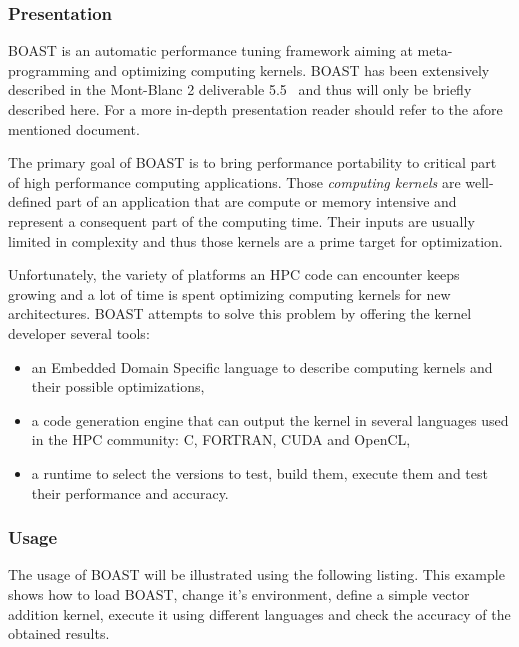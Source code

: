\subsubsection{Presentation}

BOAST is an automatic performance tuning framework aiming at meta-programming and optimizing computing kernels.
BOAST has been extensively described in the Mont-Blanc 2 deliverable 5.5~\cite{tichadou15} and thus will only be briefly described here.
For a more in-depth presentation reader should refer to the afore mentioned document.

The primary goal of BOAST is to bring performance portability to critical part of high performance computing applications.
Those \emph{computing kernels} are well-defined part of an application that are compute or memory intensive and represent a consequent part of the computing time.
Their inputs are usually limited in complexity and thus those kernels are a prime target for optimization.

Unfortunately, the variety of platforms an HPC code can encounter keeps growing and a lot of time is spent optimizing computing kernels for new architectures.
BOAST attempts to solve this problem by offering the kernel developer several tools:
\begin{itemize}
  \item an Embedded Domain Specific language to describe computing kernels and their possible optimizations,
  \item a code generation engine that can output the kernel in several languages used in the HPC community: C, FORTRAN, CUDA and OpenCL,
  \item a runtime to select the versions to test, build them, execute them and test their performance and accuracy.
\end{itemize}


\subsubsection{Usage}

The usage of BOAST will be illustrated using the following listing.
This example shows how to load BOAST, change it's environment, define a simple vector addition kernel, execute it using different languages and check the accuracy of the obtained results.


